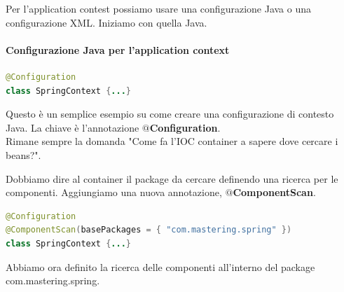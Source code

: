 \documentclass[11pt,a4paper]{book}
\begin{document}
Per l'application contest possiamo usare una configurazione Java o una configurazione XML. Iniziamo con quella Java.

\paragraph{Configurazione Java per l'application context}
\begin{lstlisting}[language = Java]
@Configuration
class SpringContext {...}
\end{lstlisting}
Questo è un semplice esempio su come creare una configurazione di contesto Java. La chiave è l'annotazione \textbf{$@$Configuration}. \\
Rimane sempre la domanda "Come fa l'IOC container a sapere dove cercare i beans?".

Dobbiamo dire al container il package da cercare definendo una ricerca per le componenti. Aggiungiamo una nuova annotazione, \textbf{$@$ComponentScan}.
\begin{lstlisting}[language = Java]
@Configuration
@ComponentScan(basePackages = { "com.mastering.spring" })
class SpringContext {...}
\end{lstlisting}
Abbiamo ora definito la ricerca delle componenti all'interno del package com.mastering.spring.
\end{document}
